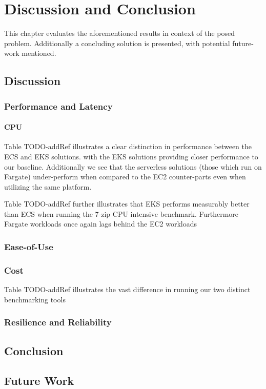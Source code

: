 \part{Discussion and Conclusion}

This chapter evaluates the aforementioned results in context of the posed problem.
Additionally a concluding solution is presented, with potential future-work mentioned.

\chapter{Discussion}

\section{Performance and Latency}
\subsection{CPU}
Table TODO-addRef illustrates a clear distinction in performance between the ECS and EKS solutions. with the EKS solutions providing closer performance to our baseline.
Additionally we see that the serverless solutions (those which run on Fargate) under-perform when compared to the EC2 counter-parts even when utilizing the same platform.

Table TODO-addRef further illustrates that EKS performs measurably better than ECS when running the 7-zip CPU intensive benchmark.
Furthermore Fargate workloads once again lags behind the EC2 workloads


\section{Ease-of-Use}

\section{Cost}
Table TODO-addRef illustrates the vast difference in running our two distinct benchmarking tools

\section{Resilience and Reliability}


\chapter{Conclusion}

\chapter{Future Work}